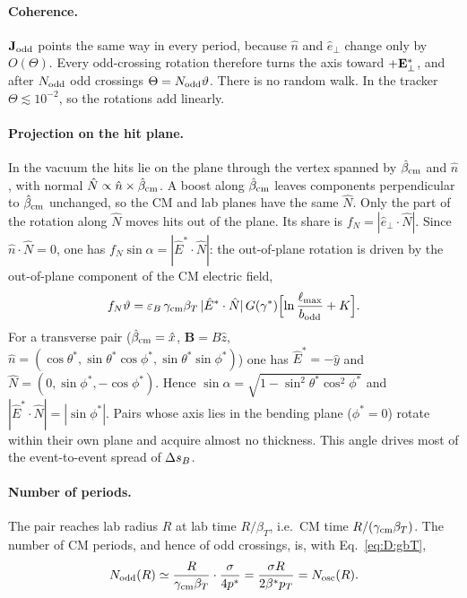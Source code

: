\paragraph{Coherence.} $\mathbf J_{\rm odd}$ points the same way in every period, because $\hat n$ and $\hat e_\perp$
change only by $O(\Theta)$. Every odd-crossing rotation therefore turns the axis toward $+\mathbf{E}^*_\perp$, and after
$N_{\rm odd}$ odd crossings $\Theta=N_{\rm odd}\vartheta$. There is no random walk. In the tracker $\Theta\lesssim10^{-2}$,
so the rotations add linearly.

\paragraph{Projection on the hit plane.} In the vacuum the hits lie on the plane through the vertex spanned by
$\hat\beta_{\rm cm}$ and $\hat n$, with normal $\hat N\propto\hat n\times\hat\beta_{\rm cm}$. A boost along
$\hat\beta_{\rm cm}$ leaves components perpendicular to $\hat\beta_{\rm cm}$ unchanged, so the CM and lab planes have
the same $\hat N$. Only the part of the rotation along $\hat N$ moves hits out of the plane. Its share is
$f_N=|\hat e_\perp\cdot\hat N|$. Since $\hat n\cdot\hat N=0$, one has $f_N\sin\alpha=|\hat E^*\cdot\hat N|$: the
out-of-plane rotation is driven by the out-of-plane component of the CM electric field,
\begin{equation}
  f_N\vartheta=\varepsilon_B\,\gamma_{\rm cm}\beta_T\,|\hat E^*\cdot\hat N|\,G(\gamma^*)\Bigl[\ln\frac{\ell_{\max}}{b_{\rm odd}}+K\Bigr].
  \label{eq:D:fNrot}
\end{equation}
For a transverse pair ($\hat\beta_{\rm cm}=\hat x$, $\mathbf B=B\hat z$, $\hat n=(\cos\theta^*,\sin\theta^*\cos\phi^*,
\sin\theta^*\sin\phi^*)$) one has $\hat E^*=-\hat y$ and $\hat N=(0,\sin\phi^*,-\cos\phi^*)$. Hence $\sin\alpha=
\sqrt{1-\sin^2\theta^*\cos^2\phi^*}$ and $|\hat E^*\cdot\hat N|=|\sin\phi^*|$. Pairs whose axis lies in the bending plane
($\phi^*=0$) rotate within their own plane and acquire almost no thickness. This angle drives most of the
event-to-event spread of $\Delta s_B$.

\paragraph{Number of periods.} The pair reaches lab radius $R$ at lab time $R/\beta_T$, i.e.\ CM time
$R/(\gamma_{\rm cm}\beta_T)$. The number of CM periods, and hence of odd crossings, is, with Eq.~\eqref{eq:D:gbT},
\begin{equation}
  N_{\rm odd}(R)\simeq\frac{R}{\gamma_{\rm cm}\beta_T}\cdot\frac{\sigma}{4p^*}=\frac{\sigma R}{2\beta^* p_T}=N_{\rm osc}(R).
  \label{eq:D:Nosc}
\end{equation}

